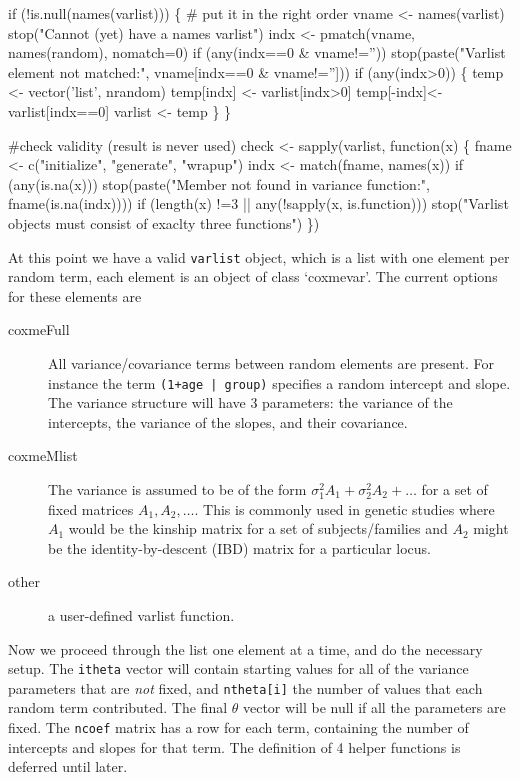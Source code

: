 \documentclass{article}
\begin{document}
\begin{nwchunk}
 
 if (!is.null(names(varlist))) \{ # put it in the right order
     vname <- names(varlist)
     stop("Cannot (yet) have a names varlist")
     indx <- pmatch(vname, names(random), nomatch=0)
     if (any(indx==0 & vname!=''))
         stop(paste("Varlist element not matched:", vname[indx==0 & vname!='']))
     if (any(indx>0)) \{
         temp <- vector('list', nrandom)
         temp[indx] <- varlist[indx>0]
         temp[-indx]<- varlist[indx==0]
         varlist <- temp
         \}
     \}
     
 #check validity (result is never used)
 check <- sapply(varlist, function(x) \{
        fname <- c("initialize", "generate", "wrapup")
        indx <- match(fname, names(x))
        if (any(is.na(x)))
            stop(paste("Member not found in variance function:",
                       fname(is.na(indx))))
        if (length(x) !=3 || any(!sapply(x, is.function)))
            stop("Varlist objects must consist of exaclty three functions")
    \})
 
\end{nwchunk}
At this point we have a valid \Verb!varlist! object, which is a list with
one element per random term, each element is an object of class `coxmevar'. %
The current options for these elements are
\begin{description}
\item [coxmeFull] All variance/covariance terms between random elements are
present.  For instance the term \Verb!(1+age | group)! specifies a random
intercept and slope.  The variance structure will have 3 parameters: the variance of the intercepts, the
variance of the slopes, and their covariance.
\item [coxmeMlist]  The variance is assumed to be of the form
$\sigma_1^2 A_1 + \sigma_2^2 A_2 + \ldots$ for a set of fixed matrices
$A_1, A_2, \ldots$.  This is commonly used in genetic studies where $A_1$
would be the kinship matrix for a set of subjects/families and $A_2$ might
be the identity-by-descent (IBD) matrix for a particular locus.
\item [other] a user-defined varlist function.
\end{description}

Now we proceed through the list one element at a time, and do the necessary
setup.
The \Verb!itheta! vector will contain starting values for all of the
variance parameters that are \emph{not} fixed, and \Verb!ntheta[i]! the
number of values that each random term contributed.
The final $\theta$ vector will be null if all the parameters are fixed. 
The \Verb!ncoef! matrix has a row for each term, containing the number
of intercepts and slopes for that term.  
The definition of 4 helper functions is deferred until later.
\end{document}

